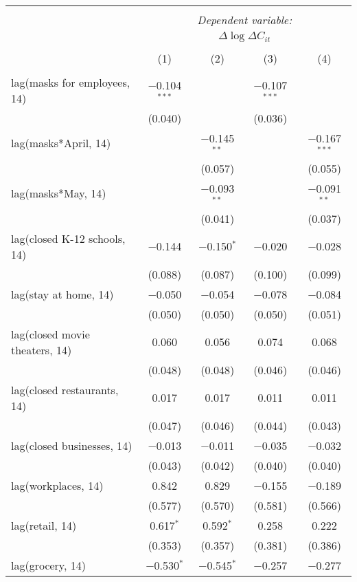 \begin{tabular}{@{\extracolsep{1pt}}lcccc} 
\\[-1.8ex]\hline 
\hline \\[-1.8ex] 
 & \multicolumn{4}{c}{\textit{Dependent variable:}} \\ 
\cline{2-5} 
 & \multicolumn{4}{c}{$\Delta \log \Delta C_{it}$} \\ 
\\[-1.8ex] & (1) & (2) & (3) & (4)\\ 
\hline \\[-1.8ex] 
 lag(masks for employees, 14) & $-$0.104$^{***}$ &  & $-$0.107$^{***}$ &  \\ 
  & (0.040) &  & (0.036) &  \\ 
  lag(masks*April, 14) &  & $-$0.145$^{**}$ &  & $-$0.167$^{***}$ \\ 
  &  & (0.057) &  & (0.055) \\ 
  lag(masks*May, 14) &  & $-$0.093$^{**}$ &  & $-$0.091$^{**}$ \\ 
  &  & (0.041) &  & (0.037) \\ 
  lag(closed K-12 schools, 14) & $-$0.144 & $-$0.150$^{*}$ & $-$0.020 & $-$0.028 \\ 
  & (0.088) & (0.087) & (0.100) & (0.099) \\ 
  lag(stay at home, 14) & $-$0.050 & $-$0.054 & $-$0.078 & $-$0.084 \\ 
  & (0.050) & (0.050) & (0.050) & (0.051) \\ 
  lag(closed movie theaters, 14) & 0.060 & 0.056 & 0.074 & 0.068 \\ 
  & (0.048) & (0.048) & (0.046) & (0.046) \\ 
  lag(closed restaurants, 14) & 0.017 & 0.017 & 0.011 & 0.011 \\ 
  & (0.047) & (0.046) & (0.044) & (0.043) \\ 
  lag(closed businesses, 14) & $-$0.013 & $-$0.011 & $-$0.035 & $-$0.032 \\ 
  & (0.043) & (0.042) & (0.040) & (0.040) \\ 
  lag(workplaces, 14) & 0.842 & 0.829 & $-$0.155 & $-$0.189 \\ 
  & (0.577) & (0.570) & (0.581) & (0.566) \\ 
  lag(retail, 14) & 0.617$^{*}$ & 0.592$^{*}$ & 0.258 & 0.222 \\ 
  & (0.353) & (0.357) & (0.381) & (0.386) \\ 
  lag(grocery, 14) & $-$0.530$^{*}$ & $-$0.545$^{*}$ & $-$0.257 & $-$0.277 \\ 

\end{tabular}
